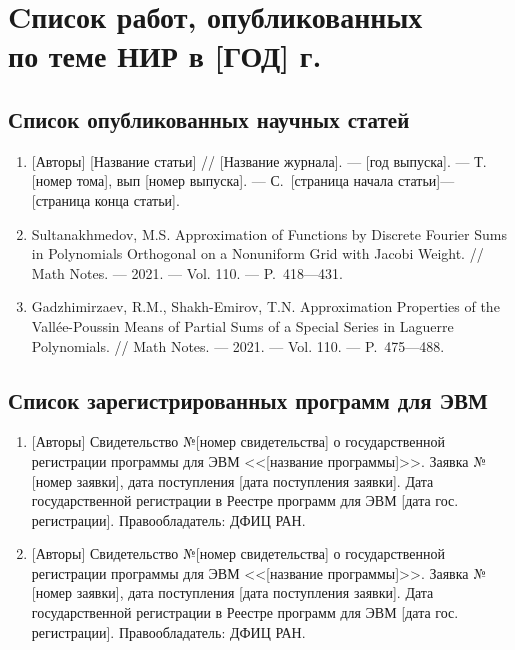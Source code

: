 \chapter{Cписок работ, опубликованных \texorpdfstring{\\ }{} по теме НИР в [ГОД] г.}


\section*{Список опубликованных научных статей}

\begin{enumerate}
    \item
    {[Авторы]}
    [Название статьи]
    //
    [Название журнала].
    --- [год выпуска].
    --- Т. [номер тома], вып [номер выпуска].
    --- С.~[страница начала статьи]---[страница конца статьи].

    \item
    \foreignlanguage{english}{%
        Sultanakhmedov, M.S.
        Approximation of Functions by Discrete Fourier Sums in Polynomials Orthogonal on a Nonuniform Grid with Jacobi Weight.
        //
        Math Notes. 
        --- 2021.
        --- Vol. 110.
        --- P.~418---431.
    }%

    \item
    \foreignlanguage{english}{%
        Gadzhimirzaev, R.M., Shakh-Emirov, T.N.
        Approximation Properties of the Vallée-Pous\-sin Means of Partial Sums of a Special Series in Laguerre Polynomials.
        //
        Math Notes. 
        --- 2021.
        --- Vol. 110.
        --- P.~475---488.
    }%

\end{enumerate}

\section*{Список зарегистрированных программ для ЭВМ}

\begin{enumerate}

    \item
    {[Авторы]} Свидетельство №[номер свидетельства] о государственной регистрации программы для ЭВМ <<[название программы]>>. Заявка №[номер заявки], дата поступления [дата поступления заявки]. Дата государственной регистрации в Реестре программ для ЭВМ [дата гос. регистрации]. Правообладатель: ДФИЦ РАН.

    \item
    {[Авторы]} Свидетельство №[номер свидетельства] о государственной регистрации программы для ЭВМ <<[название программы]>>. Заявка №[номер заявки], дата поступления [дата поступления заявки]. Дата государственной регистрации в Реестре программ для ЭВМ [дата гос. регистрации]. Правообладатель: ДФИЦ РАН.

\end{enumerate}
